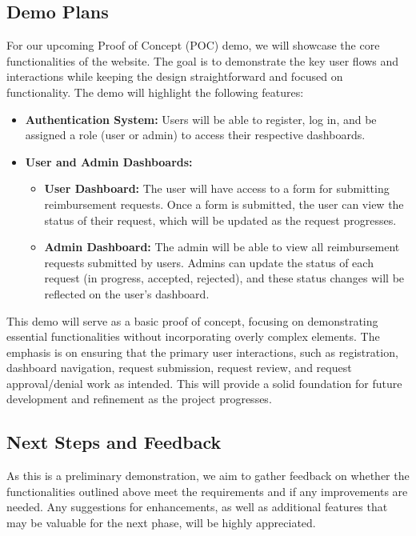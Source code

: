 \documentclass{article}
\begin{document}
\subsection{Demo Plans}

For our upcoming Proof of Concept (POC) demo, we will showcase the core functionalities of the website. The goal is to demonstrate the key user flows and interactions while keeping the design straightforward and focused on functionality. The demo will highlight the following features:

\begin{itemize}
    \item \textbf{Authentication System:} Users will be able to register, log in, and be assigned a role (user or admin) to access their respective dashboards.
    
    \item \textbf{User and Admin Dashboards:}
    \begin{itemize}
        \item \textbf{User Dashboard:} The user will have access to a form for submitting reimbursement requests. Once a form is submitted, the user can view the status of their request, which will be updated as the request progresses.
        
        \item \textbf{Admin Dashboard:} The admin will be able to view all reimbursement requests submitted by users. Admins can update the status of each request (in progress, accepted, rejected), and these status changes will be reflected on the user’s dashboard.
    \end{itemize}
\end{itemize}

This demo will serve as a basic proof of concept, focusing on demonstrating essential functionalities without incorporating overly complex elements. The emphasis is on ensuring that the primary user interactions, such as registration, dashboard navigation, request submission, request review, and request approval/denial work as intended. This will provide a solid foundation for future development and refinement as the project progresses.

\subsection{Next Steps and Feedback}

As this is a preliminary demonstration, we aim to gather feedback on whether the functionalities outlined above meet the requirements and if any improvements are needed. Any suggestions for enhancements, as well as additional features that may be valuable for the next phase, will be highly appreciated.
\end{document}
